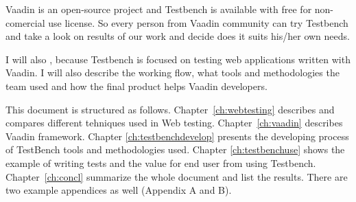 	  Vaadin is an open-source project and Testbench is available with free for non-comercial use license. 
	  So every person from Vaadin community can try Testbench and take a look on results of our work and
	   decide does it suits his/her own needs.
	  
	  	 
	  I will also , because Testbench is focused on testing web
	 applications written with Vaadin. I will also describe the working flow, what
	 tools and methodologies the team used and how the final product helps
	 Vaadin developers.
	  
	  
	  This document is structured as follows. Chapter~\ref{ch:webtesting} describes
	  and compares different tehniques used in Web testing. Chapter~\ref{ch:vaadin} describes Vaadin framework.
	  Chapter \ref{ch:testbenchdevelop} presents the developing process of TestBench tools and methodologies used. Chapter
	  \ref{ch:testbenchuse} shows the example of writing tests and the value for
	  end user from using Testbench. Chapter~\ref{ch:concl} summarize the whole
	  document and list the results. There are two example appendices as well (Appendix A and B).
